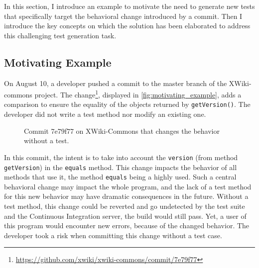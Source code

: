 In this section, I introduce an example to motivate the need to generate new tests that specifically target the behavioral change introduced by a commit.
Then I introduce the key concepts on which the solution has been elaborated to address this challenging test generation task.

\subsection{Motivating Example}
\label{subsec:dci:background:example}

On August 10, a developer pushed a commit to the master branch of the XWiki-commons project. 
The change\footnote{\url{https://github.com/xwiki/xwiki-commons/commit/7e79f77}}, displayed in \autoref{fig:motivating_example}, adds a comparison to ensure the equality of the objects returned by \texttt{getVersion()}.
The developer did not write a test method nor modify an existing one. 

\begin{figure}[h]
	\centering
	\caption{Commit 7e79f77 on XWiki-Commons that changes the behavior without a test.}
	\label{fig:motivating_example}
\end{figure}

In this commit, the intent is to take into account the \texttt{version} (from method \texttt{getVersion}) in the \texttt{equals} method.
This change impacts the behavior of all methods that use it, the method \texttt{equals} being a highly used.
Such a central behavioral change may impact the whole program, and the lack of a test method for this new behavior may have dramatic consequences in the future.
Without a test method, this change could be reverted and go undetected by the test suite and the Continuous Integration server, \ie the build would still pass.
Yet, a user of this program would encounter new errors, because of the changed behavior.
The developer took a risk when committing this change without a test case.

